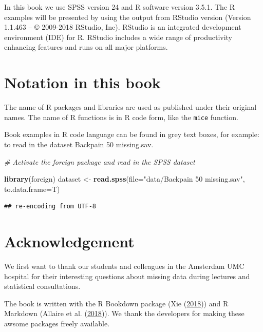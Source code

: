 \documentclass[
]{book}
\newenvironment{Shaded}{\begin{snugshade}}{\end{snugshade}}
\newcommand{\CommentTok}[1]{\textcolor[rgb]{0.56,0.35,0.01}{\textit{#1}}}
\newcommand{\DataTypeTok}[1]{\textcolor[rgb]{0.13,0.29,0.53}{#1}}
\newcommand{\KeywordTok}[1]{\textcolor[rgb]{0.13,0.29,0.53}{\textbf{#1}}}
\newcommand{\NormalTok}[1]{#1}
\newcommand{\StringTok}[1]{\textcolor[rgb]{0.31,0.60,0.02}{#1}}
\begin{document}
In this book we use SPSS version 24 and R software version 3.5.1. The R
examples will be presented by using the output from RStudio version
(Version 1.1.463 -- © 2009-2018 RStudio, Inc). RStudio is an integrated
development environment (IDE) for R. RStudio includes a wide range of
productivity enhancing features and runs on all major platforms.

\hypertarget{notation-in-this-book}{%
\section*{Notation in this book}\label{notation-in-this-book}}

The name of R packages and libraries are used as published under their
original names. The name of R functions is in R code form, like the
\texttt{mice} function.

Book examples in R code language can be found in grey text boxes, for
example: to read in the dataset Backpain 50 missing.sav.

\begin{Shaded}
\begin{Highlighting}[]
\CommentTok{# Activate the foreign package and read in the SPSS dataset}

\KeywordTok{library}\NormalTok{(foreign)}
\NormalTok{dataset <-}\StringTok{ }\KeywordTok{read.spss}\NormalTok{(}\DataTypeTok{file=}\StringTok{"data/Backpain 50 missing.sav"}\NormalTok{, }\DataTypeTok{to.data.frame=}\NormalTok{T)}
\end{Highlighting}
\end{Shaded}

\begin{verbatim}
## re-encoding from UTF-8
\end{verbatim}

\hypertarget{acknowledgement}{%
\section*{Acknowledgement}\label{acknowledgement}}

We first want to thank our students and colleagues in the Amsterdam UMC
hospital for their interesting questions about missing data during
lectures and statistical consultations.

The book is written with the R Bookdown package (Xie
(\protect\hyperlink{ref-R-bookdown}{2018})) and R Markdown (Allaire et
al. (\protect\hyperlink{ref-R-rmarkdown}{2018})). We thank the
developers for making these awsome packages freely available.
\end{document}
